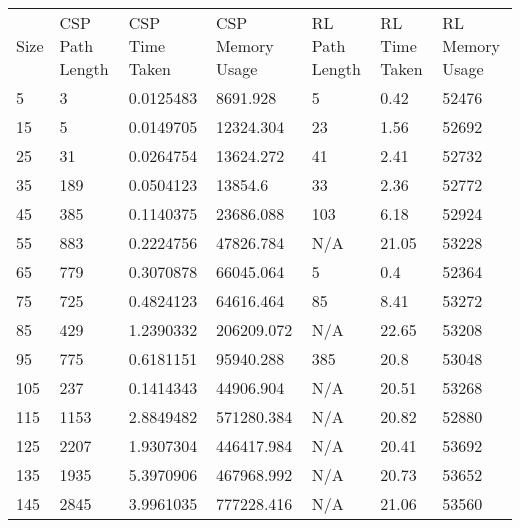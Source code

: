 \begin{tabular}{lllllll}
Size & CSP Path Length & CSP Time Taken & CSP Memory Usage & RL Path Length & RL Time Taken & RL Memory Usage \\
5    & 3               & 0.0125483      & 8691.928         & 5              & 0.42          & 52476           \\
15   & 5               & 0.0149705      & 12324.304        & 23             & 1.56          & 52692           \\
25   & 31              & 0.0264754      & 13624.272        & 41             & 2.41          & 52732           \\
35   & 189             & 0.0504123      & 13854.6          & 33             & 2.36          & 52772           \\
45   & 385             & 0.1140375      & 23686.088        & 103            & 6.18          & 52924           \\
55   & 883             & 0.2224756      & 47826.784        & N/A            & 21.05         & 53228           \\
65   & 779             & 0.3070878      & 66045.064        & 5              & 0.4           & 52364           \\
75   & 725             & 0.4824123      & 64616.464        & 85             & 8.41          & 53272           \\
85   & 429             & 1.2390332      & 206209.072       & N/A            & 22.65         & 53208           \\
95   & 775             & 0.6181151      & 95940.288        & 385            & 20.8          & 53048           \\
105  & 237             & 0.1414343      & 44906.904        & N/A            & 20.51         & 53268           \\
115  & 1153            & 2.8849482      & 571280.384       & N/A            & 20.82         & 52880           \\
125  & 2207            & 1.9307304      & 446417.984       & N/A            & 20.41         & 53692           \\
135  & 1935            & 5.3970906      & 467968.992       & N/A            & 20.73         & 53652           \\
145  & 2845            & 3.9961035      & 777228.416       & N/A            & 21.06         & 53560           \\

\end{tabular}
